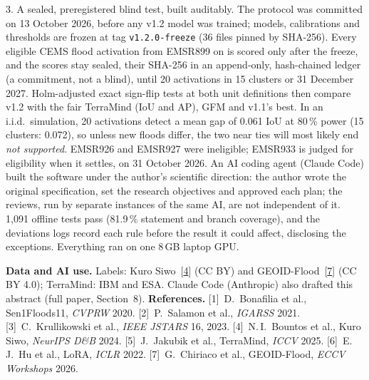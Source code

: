 \documentclass[10pt,twocolumn,a4paper]{article}
\makeatletter
\newcommand{\pp}{\,\%}
\newcommand{\refn}[2]{\hyperref[ref:#1]{#2}}
\renewcommand\paragraph{\@startsection{paragraph}{4}{\z@}{0.9ex \@plus .4ex \@minus .2ex}{-1em}%
  {\normalfont\normalsize\bfseries}}
\makeatother
\begin{document}
\paragraph{3. A sealed, preregistered blind test, built auditably.}
The protocol was committed on 13 October 2026, before any v1.2 model was trained; models, calibrations and thresholds
are frozen at tag \texttt{v1.2.0-freeze} (36 files pinned by SHA-256). Every eligible CEMS flood activation from
EMSR899 on is scored only after the freeze, and the scores stay sealed, their SHA-256 in an append-only, hash-chained
ledger (a commitment, not a blind), until 20 activations in 15 clusters or 31 December 2027. Holm-adjusted exact
sign-flip tests at both unit definitions then compare v1.2 with the fair TerraMind (IoU and AP), GFM and v1.1's best.
In an i.i.d.\ simulation, 20 activations detect a mean gap of 0.061 IoU at 80\pp{} power (15 clusters: 0.072), so
unless new floods differ, the two near ties will most likely end \emph{not supported}. EMSR926 and EMSR927 were
ineligible; EMSR933 is judged for eligibility when it settles, on 31 October 2026. An AI coding agent (Claude Code)
built the software under the author's scientific direction: the author wrote the original specification, set the
research objectives and approved each plan; the reviews, run by separate instances of the same AI, are not independent of
it. 1,091 offline tests pass (81.9\pp{} statement and branch coverage), and the deviations logs record each rule
before the result it could affect, disclosing the exceptions. Everything ran on one 8\,GB laptop GPU.

\vspace{2pt}
{\scriptsize\noindent\textbf{Data and AI use.} Labels: Kuro Siwo~[\refn{bountos2024kurosiwo}{4}] (CC BY) and GEOID-Flood~[\refn{chiriaco2026geoid}{7}] (CC BY 4.0); TerraMind: IBM
and ESA. Claude Code (Anthropic) also drafted this abstract (full paper, Section~8).
\textbf{References.}
\label{ref:bonafilia2020sen1floods11}[1]~D.~Bonafilia et al., Sen1Floods11, \emph{CVPRW} 2020.
\label{ref:salamon2021gfm}[2]~P.~Salamon et al., \emph{IGARSS} 2021.
\label{ref:krullikowski2023gfm}[3]~C.~Krullikowski et al., \emph{IEEE JSTARS} 16, 2023.
\label{ref:bountos2024kurosiwo}[4]~N.\,I.~Bountos et al., Kuro Siwo, \emph{NeurIPS D\&B} 2024.
\label{ref:jakubik2025terramind}[5]~J.~Jakubik et al., TerraMind, \emph{ICCV} 2025.
\label{ref:hu2021lora}[6]~E.\,J.~Hu et al., LoRA, \emph{ICLR} 2022.
\label{ref:chiriaco2026geoid}[7]~G.~Chiriaco et al., GEOID-Flood, \emph{ECCV Workshops} 2026.\par}
\end{document}
